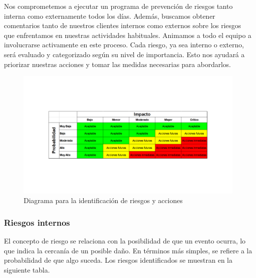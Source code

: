     Nos comprometemos a ejecutar un programa de prevención de riesgos tanto interna como externamente todos los días. Además, buscamos obtener comentarios tanto de nuestros clientes internos como externos sobre los riesgos que enfrentamos en nuestras actividades habituales. Animamos a todo el equipo a involucrarse activamente en este proceso. Cada riesgo, ya sea interno o externo, será evaluado y categorizado según su nivel de importancia. Esto nos ayudará a priorizar nuestras acciones y tomar las medidas necesarias para abordarlos.
    \begin{figure}[H]
        \centering
        \includegraphics[scale=0.185]{30/img/Tabla de riesgo.pdf}
        \caption{Diagrama para la identificación de riesgos y acciones}
    \end{figure}
    \subsubsection{Riesgos internos}
    
    El concepto de riesgo se relaciona con la posibilidad de que un evento ocurra, lo que indica la cercanía de un posible daño. En términos más simples, se refiere a la probabilidad de que algo suceda. Los riesgos identificados se muestran en la siguiente tabla.
    
